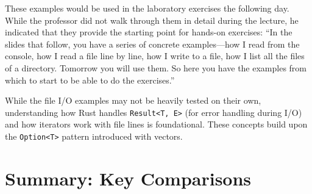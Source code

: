 These examples would be used in the laboratory exercises the following day. While the professor did not walk through them in detail during the lecture, he indicated that they provide the starting point for hands-on exercises: ``In the slides that follow, you have a series of concrete examples---how I read from the console, how I read a file line by line, how I write to a file, how I list all the files of a directory. Tomorrow you will use them. So here you have the examples from which to start to be able to do the exercises.''

\begin{exambox}
While the file I/O examples may not be heavily tested on their own, understanding how Rust handles \texttt{Result<T, E>} (for error handling during I/O) and how iterators work with file lines is foundational. These concepts build upon the \texttt{Option<T>} pattern introduced with vectors.
\end{exambox}

\section*{Summary: Key Comparisons}

